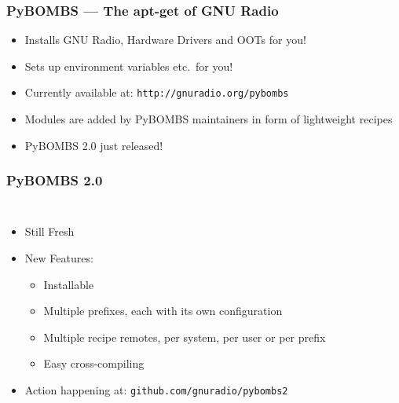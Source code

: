 \documentclass{beamer}
\begin{document}
\begin{frame}
  \frametitle{PyBOMBS --- The apt-get of GNU Radio}
  \begin{itemize}
    \item Installs GNU Radio, Hardware Drivers and OOTs for you!
    \item Sets up environment variables etc.\ for you!
    \item Currently available at: \texttt{http://gnuradio.org/pybombs}
    \item Modules are added by PyBOMBS maintainers in form of lightweight recipes
    \item PyBOMBS 2.0 just released!
  \end{itemize}
\end{frame}

\begin{frame}
  \frametitle{PyBOMBS 2.0}

  \begin{columns}[c]
    \column[T]{9cm}

  \begin{itemize}
    \item Still Fresh
    \item New Features:
      \begin{itemize}
        \item Installable
        \item Multiple prefixes, each with its own configuration
        \item Multiple recipe remotes, per system, per user or per prefix
        \item Easy cross-compiling
      \end{itemize}
    \item Action happening at: \texttt{github.com/gnuradio/pybombs2}
  \end{itemize}

    \column[T]{2cm}


\end{columns}
\end{frame}
\end{document}
